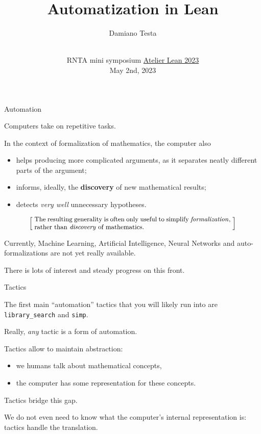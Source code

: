 \documentclass{beamer}
\title{Automatization in Lean}
\author{Damiano Testa}
\institute{University of Warwick}
\date{\\
\vspace{50pt}
RNTA mini symposium
\href{http://www.rnta.eu/7MSRNTA/lean.html}{Atelier Lean 2023}\\
\vspace{20pt}
May 2nd, 2023
}
\begin{document}
\frame{\titlepage}

\begin{frame}[fragile]
{Automation}

Computers take on repetitive tasks.
\bigskip

In the context of formalization of mathematics, the computer also

\begin{itemize}
\item
  helps producing more complicated arguments, as it separates neatly different parts of the argument;
\item
  informs, ideally, the {\textbf{discovery}} of new mathematical results;
\item
  detects {\emph{very well}} unnecessary hypotheses.
\end{itemize}

\smallskip
\[
  \left[ \;
  \makebox{\parbox{0.8\textwidth}{\small
  The resulting generality is often only useful to simplify {\emph{formalization}}, rather than {\emph{discovery}} of mathematics.
  }}
  \; \right]
\]
\bigskip

Currently, Machine Learning, Artificial Intelligence, Neural Networks and auto-formalizations are not yet really available.
\bigskip

There is lots of interest and steady progress on this front.
\end{frame}

\begin{frame}[fragile]{Tactics}

The first main ``automation'' tactics that you will likely run into are {\verb`library_search`} and {\verb`simp`}.
\bigskip

Really, {\emph{any}} tactic is a form of automation.
\bigskip

Tactics allow to maintain abstraction:

\begin{itemize}
\item
  we humans talk about mathematical concepts,
\item
  the computer has some representation for these concepts.
\end{itemize}

Tactics bridge this gap.
\bigskip

We do not even need to know what the computer's internal representation is: tactics handle the translation.
\end{frame}
\end{document}
